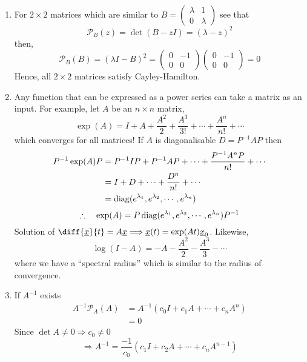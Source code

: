 \documentclass{article}
\numberwithin{equation}{section}
\begin{document}
\begin{remark}\leavevmode
    \begin{enumerate}
        \item For $2 \times 2$ matrices which are similar to $B = \begin{pmatrix}
            \lambda & 1 \\
            0 & \lambda
        \end{pmatrix}$ see that
        \[
            \mathcal{P}_B(z) = \det(B - zI) = (\lambda - z)^2
        \]
        then,
        \[
            \mathcal{P}_B(B) = (\lambda I - B)^2 = \begin{pmatrix}
                0 & -1 \\
                0 & 0
            \end{pmatrix}\begin{pmatrix}
                0 & -1 \\
                0 & 0
            \end{pmatrix} = 0
        \]
        Hence, all $2 \times 2$ matrices satisfy Cayley-Hamilton.
        
        \item Any function that can be expressed as a power series can take a matrix as an input.
        For example, let $A$ be an $n \times n$ matrix,
        \[
            \exp(A) = I + A + \frac{A^2}{2} + \frac{A^3}{3!} + \cdots + \frac{A^n}{n!} + \cdots
        \]
        which converges for all matrices! If $A$ is diagonalisable $D = P^{-1}AP$ then
        \begin{align*}
            P^{-1} \exp(A) P &= P^{-1}IP + P^{-1}AP + \cdots + \frac{P^{-1}A^nP}{n!} + \cdots \\
            &= I + D + \cdots + \frac{D^n}{n!} + \cdots \\
            &= \operatorname{diag}(e^{\lambda_1}, e^{\lambda_2}, \cdots, e^{\lambda_n})
        \end{align*}
        \[
            \therefore \quad \exp(A) = P \operatorname{diag}(e^{\lambda_1}, e^{\lambda_2}, \cdots, e^{\lambda_n}) P^{-1}
        \]
        Solution of $\diff{\vec x}{t} = A \vec x \Longrightarrow \vec x(t) = \exp(At)\vec x_0$.
        Likewise, 
        \[
            \log (I - A) = - A - \frac{A^2}{2} - \frac{A^3}{3} - \cdots  
        \]
        where we have a ``spectral radius'' which is similar to the radius of convergence.

        \item If $A^{-1}$ exists
        \begin{align*}
            A^{-1}\mathcal{P}_A(A) &= A^{-1}(c_0 I + c_1 A + \cdots + c_n A^n) \\
            &= 0
        \end{align*}
        Since $\det A \neq 0 \Longrightarrow c_0 \neq 0$
        \[
            \Rightarrow A^{-1} = \frac{-1}{c_0}(c_1 I + c_2 A + \cdots + c_n A^{n-1})
        \]
    \end{enumerate}
\end{remark}
\end{document}
